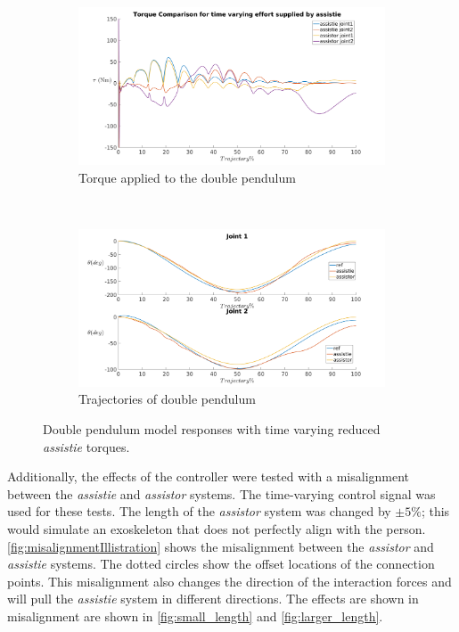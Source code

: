 \begin{figure}[h]
    \centering
    \begin{subfigure}{0.5\textwidth}
        \centering
        \includegraphics[width=\linewidth]{images/controllers/time_varying_torque.png}
        \caption[Double Pendulum: Time varying Torque-Effort]{Torque applied to the double pendulum}
        \label{fig:time_varying_torque}
    \end{subfigure}%
    ~
    \begin{subfigure}{0.5\textwidth}
        \centering
        \includegraphics[width=\linewidth]{images/controllers/time_varying_traj.png}
        \caption[Double Pendulum: Time Varying Effort-Trajectory]{Trajectories of double pendulum}
        \label{fig:time_varying_traj}
    \end{subfigure}
    \caption[Double Pendulum: Time Varying Torque]{Double pendulum model responses with time varying reduced \textit{ assistie} torques.}
    \label{fig:time_varying}
\end{figure}


Additionally, the effects of the controller were tested with a misalignment between the \textit{assistie} and \textit{assistor} systems. The time-varying control signal was used for these tests. The length of the \textit{assistor} system was changed by $\pm 5\%$; this would simulate an exoskeleton that does not perfectly align with the person. \autoref{fig:misalignmentIllistration} shows the misalignment between  the \textit{assistor} and \textit{assistie} systems. The dotted circles show the offset locations of the connection points. This misalignment also changes the direction of the interaction forces and will pull the \textit{assistie} system in different directions. The effects are shown in misalignment are shown in \autoref{fig:small_length} and \autoref{fig:larger_length}.


